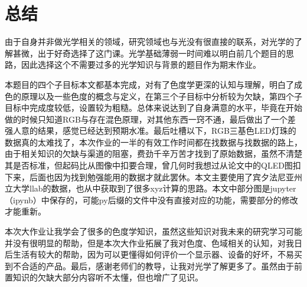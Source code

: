 \section{总结}

由于自身并非做光学相关的领域，研究领域也与光没有很直接的联系，对光学的了解甚微，出于好奇选择了这门课。光学基础薄弱一时间难以明白前几个题目的思路，因此选择这个不需要过多的光学知识与背景的题目作为期末作业。

本题目的四个子目标本文都基本完成，对有了色度学更深的认知与理解，明白了成色的原理以及一些色度的概念与定义，在第三个子目标中分析较为欠缺，第四个子目标中完成度较低，设置较为粗糙。总体来说达到了自身满意的水平，毕竟在开始做的时候只知道RGB与存在混色原理，对其他东西一窍不通，最后做出了一个差强人意的结果，感觉已经达到预期水准。最后吐槽以下，RGB三基色LED灯珠的数据真的太难找了，本次作业的一半的有效工作时间都在找数据与找数据的路上，由于相关知识的欠缺与渠道的阻塞，费劲千辛万苦才找到了原始数据，虽然不清楚其是否标准，但起码比从图像中扣要合理，曾几何时我想过从论文中的QLED图扣下来，后面也因为找到勉强能用的数据才就此罢休。本文主要使用了宾夕法尼亚州立大学llab的数据，也从中获取到了很多xyz计算的思路。本文中部分图是jupyter（ipynb）中保存的，可能py后缀的文件中没有直接对应的功能，需要部分的修改才能重新。

本次大作业让我学会了很多的色度学知识，虽然这些知识对我未来的研究学习可能并没有很明显的帮助，但是本次大作业拓展了我对色度、色域相关的认知，对我日后生活有较大的帮助，因为可以更懂得如何评价一个显示器、设备的好坏，不易买到不合适的产品。最后，感谢老师们的教导，让我对光学了解更多了。虽然由于前置知识的欠缺大部分内容听不太懂，但也增广了见识。